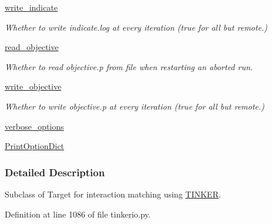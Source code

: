 \begin{DoxyCompactItemize}
\hyperlink{classforcebalance_1_1target_1_1Target_a3a2f5d4bbb8d6ecb580eadb261977a57}{write\-\_\-indicate}
\begin{DoxyCompactList}\small\item\em Whether to write indicate.\-log at every iteration (true for all but remote.) \end{DoxyCompactList}\item 
\hyperlink{classforcebalance_1_1target_1_1Target_a22bdc4bbce2020ae44b44ad3e444fda6}{read\-\_\-objective}
\begin{DoxyCompactList}\small\item\em Whether to read objective.\-p from file when restarting an aborted run. \end{DoxyCompactList}\item 
\hyperlink{classforcebalance_1_1target_1_1Target_a7a95624dfe03f0cee0e5f1ae09db306a}{write\-\_\-objective}
\begin{DoxyCompactList}\small\item\em Whether to write objective.\-p at every iteration (true for all but remote.) \end{DoxyCompactList}\item 
\hyperlink{classforcebalance_1_1BaseClass_afd68efa29ccd2f320f4cf82198214aac}{verbose\-\_\-options}
\item 
\hyperlink{classforcebalance_1_1BaseClass_afc6659278497d7245bc492ecf405ccae}{Print\-Option\-Dict}
\end{DoxyCompactItemize}


\subsubsection{Detailed Description}
Subclass of Target for interaction matching using \hyperlink{classforcebalance_1_1tinkerio_1_1TINKER}{T\-I\-N\-K\-E\-R}. 



Definition at line 1086 of file tinkerio.\-py.



